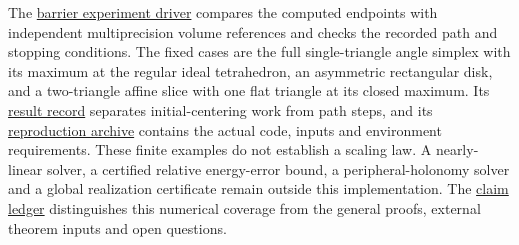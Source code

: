 The \href{../experiments/section9/barrier_run.py}{barrier experiment driver}
compares the computed endpoints with independent multiprecision volume
references and checks the recorded path and stopping conditions. The fixed
cases are the full single-triangle angle simplex with its maximum at the
regular ideal tetrahedron, an asymmetric rectangular disk, and a two-triangle
affine slice with one flat triangle at its closed maximum. Its
\href{../artifacts/section9/barrier-result.json}{result record} separates
initial-centering work from path steps, and its
\href{../site/section9/downloads/barrier-reproduction.zip}{reproduction archive}
contains the actual code, inputs and environment requirements. These finite
examples do not establish a scaling law. A nearly-linear solver, a certified
relative energy-error bound, a peripheral-holonomy solver and a global
realization certificate remain outside this implementation. The
\href{claims/section9.json}{claim ledger} distinguishes this numerical
coverage from the general proofs, external theorem inputs and open questions.

